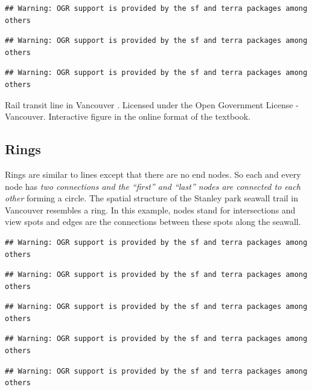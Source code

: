 \documentclass[
]{book}
\begin{document}
\begin{verbatim}
## Warning: OGR support is provided by the sf and terra packages among others
\end{verbatim}

\begin{verbatim}
## Warning: OGR support is provided by the sf and terra packages among others
\end{verbatim}

\begin{verbatim}
## Warning: OGR support is provided by the sf and terra packages among others
\end{verbatim}

\label{fig:8-vancouver-rail-transit}Rail transit line in Vancouver \citep{city_of_vancouver_open_nodate}. Licensed under the Open Government License - Vancouver. Interactive figure in the online format of the textbook.

\hypertarget{rings}{%
\subsection{Rings}\label{rings}}

Rings are similar to lines except that there are no end nodes. So each and every node has \emph{two connections and the ``first'' and ``last'' nodes are connected to each other} forming a circle. The spatial structure of the Stanley park seawall trail in Vancouver resembles a ring. In this example, nodes stand for intersections and view spots and edges are the connections between these spots along the seawall.

\begin{verbatim}
## Warning: OGR support is provided by the sf and terra packages among others
\end{verbatim}

\begin{verbatim}
## Warning: OGR support is provided by the sf and terra packages among others
\end{verbatim}

\begin{verbatim}
## Warning: OGR support is provided by the sf and terra packages among others
\end{verbatim}

\begin{verbatim}
## Warning: OGR support is provided by the sf and terra packages among others
\end{verbatim}

\begin{verbatim}
## Warning: OGR support is provided by the sf and terra packages among others
\end{verbatim}
\end{document}

